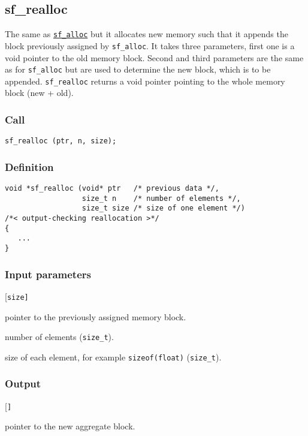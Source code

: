 \subsection{{sf\_realloc}}
The same as \hyperref[sec:sf_alloc]{\texttt{sf\_alloc}} but it allocates new memory such that it appends the block previously assigned by \texttt{sf\_alloc}. It takes three parameters, first one is a void pointer to the old memory block. Second and third parameters are the same as for \texttt{sf\_alloc} but are used to determine the new block, which is to be appended.
\texttt{sf\_realloc} returns a void pointer pointing to the whole memory block (new + old).


\subsubsection*{Call}
\begin{verbatim}sf_realloc (ptr, n, size);\end{verbatim}

\subsubsection*{Definition}
\begin{verbatim}
void *sf_realloc (void* ptr   /* previous data */, 
                  size_t n    /* number of elements */, 
                  size_t size /* size of one element */)
/*< output-checking reallocation >*/
{
   ...
}
\end{verbatim}

\subsubsection*{Input parameters}
\begin{desclist}{\tt }{\quad}[\tt size]
   \setlength\itemsep{0pt}
   \item[ptr]  pointer to the previously assigned memory block.
   \item[n]	   number of elements (\texttt{size\_t}).
   \item[size] size of each element, for example \texttt{sizeof(float)} (\texttt{size\_t}).
\end{desclist}

\subsubsection*{Output}
\begin{desclist}{\tt }{\quad}[\tt ]
   \setlength\itemsep{0pt}
   \item[ptr]	pointer to the new aggregate block.
\end{desclist}





